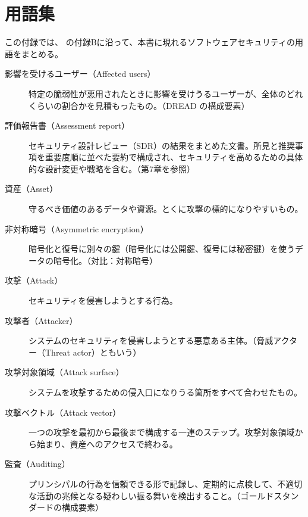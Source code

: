 \documentclass[uplatex]{jsarticle}
\begin{document}
\newpage

\section{用語集}

この付録では、\cite{Kohnfelder2021} の付録Bに沿って、本書に現れるソフトウェアセキュリティの用語をまとめる。

\begin{description}
\item[影響を受けるユーザー（Affected users）]
特定の脆弱性が悪用されたときに影響を受けうるユーザーが、全体のどれくらいの割合かを見積もったもの。（DREAD の構成要素）

\item[評価報告書（Assessment report）]
セキュリティ設計レビュー（SDR）の結果をまとめた文書。所見と推奨事項を重要度順に並べた要約で構成され、セキュリティを高めるための具体的な設計変更や戦略を含む。（第7章を参照）

\item[資産（Asset）]
守るべき価値のあるデータや資源。とくに攻撃の標的になりやすいもの。

\item[非対称暗号（Asymmetric encryption）]
暗号化と復号に別々の鍵（暗号化には公開鍵、復号には秘密鍵）を使うデータの暗号化。（対比：対称暗号）

\item[攻撃（Attack）]
セキュリティを侵害しようとする行為。

\item[攻撃者（Attacker）]
システムのセキュリティを侵害しようとする悪意ある主体。（脅威アクター（Threat actor）ともいう）

\item[攻撃対象領域（Attack surface）]
システムを攻撃するための侵入口になりうる箇所をすべて合わせたもの。

\item[攻撃ベクトル（Attack vector）]
一つの攻撃を最初から最後まで構成する一連のステップ。攻撃対象領域から始まり、資産へのアクセスで終わる。

\item[監査（Auditing）]
プリンシパルの行為を信頼できる形で記録し、定期的に点検して、不適切な活動の兆候となる疑わしい振る舞いを検出すること。（ゴールドスタンダードの構成要素）


\end{description}
\end{document}
